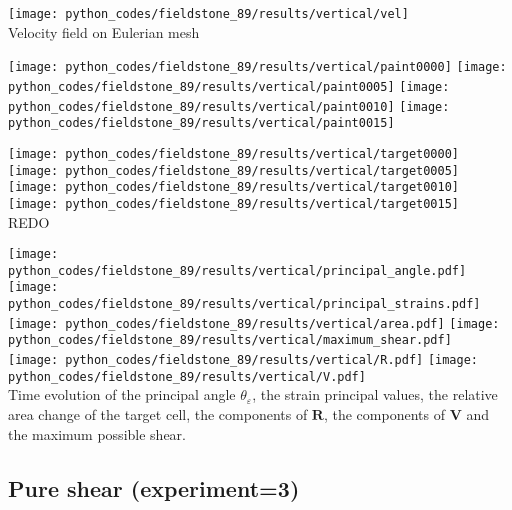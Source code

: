 \begin{center}
\texttt{[image: python\_codes/fieldstone\_89/results/vertical/vel]}\\
{\captionfont Velocity field on Eulerian mesh}
\end{center}


\begin{center}
\texttt{[image: python\_codes/fieldstone\_89/results/vertical/paint0000]}
\texttt{[image: python\_codes/fieldstone\_89/results/vertical/paint0005]}
\texttt{[image: python\_codes/fieldstone\_89/results/vertical/paint0010]}
\texttt{[image: python\_codes/fieldstone\_89/results/vertical/paint0015]}
\end{center}

\begin{center}
\texttt{[image: python\_codes/fieldstone\_89/results/vertical/target0000]}
\texttt{[image: python\_codes/fieldstone\_89/results/vertical/target0005]}
\texttt{[image: python\_codes/fieldstone\_89/results/vertical/target0010]}
\texttt{[image: python\_codes/fieldstone\_89/results/vertical/target0015]}\\
REDO
\end{center}

\begin{center}
\texttt{[image: python\_codes/fieldstone\_89/results/vertical/principal\_angle.pdf]}
\texttt{[image: python\_codes/fieldstone\_89/results/vertical/principal\_strains.pdf]}\\
\texttt{[image: python\_codes/fieldstone\_89/results/vertical/area.pdf]}
\texttt{[image: python\_codes/fieldstone\_89/results/vertical/maximum\_shear.pdf]}\\
\texttt{[image: python\_codes/fieldstone\_89/results/vertical/R.pdf]}
\texttt{[image: python\_codes/fieldstone\_89/results/vertical/V.pdf]}\\
{\captionfont Time evolution of the principal angle $\theta_\varepsilon$, 
the strain principal values, the relative area change of the target cell, 
the components of ${\bm R}$, the components of ${\bm V}$ and the maximum
possible shear.}
\end{center}





\newpage
\subsection*{Pure shear (experiment=3)}

